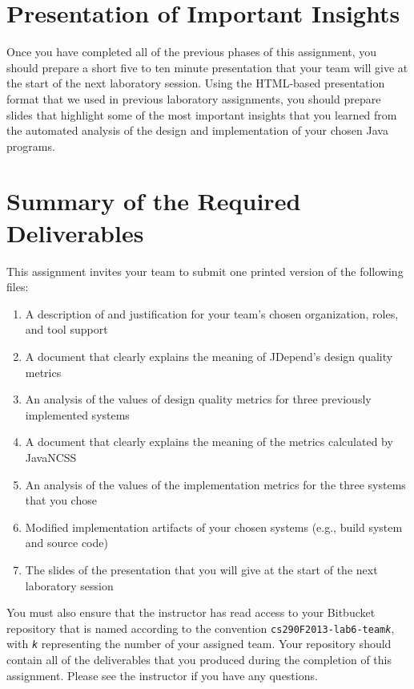 \section*{Presentation of Important Insights}

Once you have completed all of the previous phases of this assignment, you should prepare a short five to ten minute
presentation that your team will give at the start of the next laboratory session. Using the HTML-based presentation
format that we used in previous laboratory assignments, you should prepare slides that highlight some of the most
important insights that you learned from the automated analysis of the design and implementation of your chosen Java programs.

\section*{Summary of the Required Deliverables}

This assignment invites your team to submit one printed version of the following files:
\vspace*{-.1in}
\begin{enumerate}
	\itemsep0em 
	\item A description of and justification for your team's chosen organization, roles, and tool support
	\item A document that clearly explains the meaning of JDepend's design quality metrics 
	\item An analysis of the values of design quality metrics for three previously implemented systems 
	\item A document that clearly explains the meaning of the metrics calculated by JavaNCSS
	\item An analysis of the values of the implementation metrics for the three systems that you chose
	\item Modified implementation artifacts of your chosen systems (e.g., build system and source code) 
	\item The slides of the presentation that you will give at the start of the next laboratory session
\end{enumerate}
\vspace*{-.1in}

You must also ensure that the instructor has read access to your Bitbucket repository that is named according to the
convention {\tt cs290F2013-lab6-team{\em k}}, with {\tt {\em k}} representing the number of your assigned team.  Your
repository should contain all of the deliverables that you produced during the completion of this assignment.  Please
see the instructor if you have any questions.


